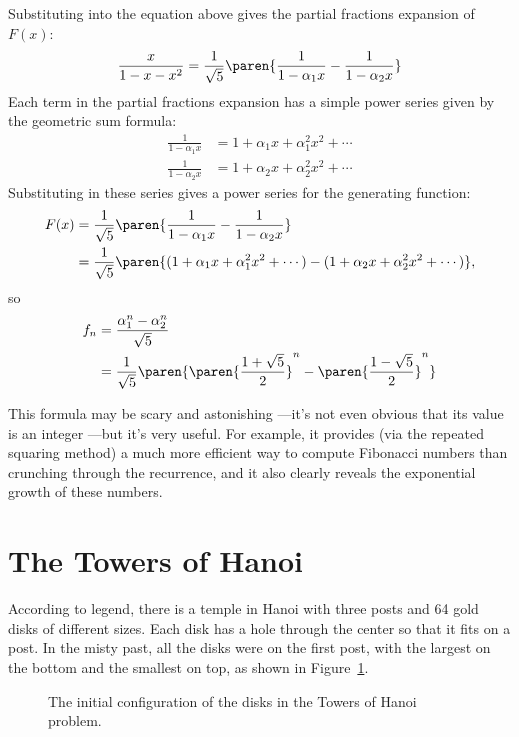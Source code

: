Substituting into the equation above gives the partial fractions
expansion of $F(x)$:
%
\[
\frac{x}{1 - x - x^2} =
        \frac{1}{\sqrt{5}}
        \paren{\frac{1}{1 - \alpha_1 x} - \frac{1}{1 - \alpha_2 x}}
\]
%
Each term in the partial fractions expansion has a simple power series
given by the geometric sum formula:
%
\begin{align*}
\frac{1}{1 - \alpha_1 x} & = 1 + \alpha_1 x + \alpha_1^2 x^2 + \cdots \\
\frac{1}{1 - \alpha_2 x} & = 1 + \alpha_2 x + \alpha_2^2 x^2 + \cdots
\end{align*}
%
Substituting in these series gives a power series for the generating
function:
%
\begin{align*}
F(x) & =
  \frac{1}{\sqrt{5}}
  \paren{\frac{1}{1 - \alpha_1 x} -
        \frac{1}{1 - \alpha_2 x}}\\
    & = \frac{1}{\sqrt{5}}
        \paren{(1 + \alpha_1 x + \alpha_1^2 x^2 + \cdots) -
        (1 + \alpha_2 x + \alpha_2^2 x^2 + \cdots)},
\end{align*}
so
\begin{align*}
 f_n & = \frac{\alpha_1^n - \alpha_2^n}{\sqrt{5}} \\
                & = \frac{1}{\sqrt{5}}
        \paren{
         \paren{\frac{1 + \sqrt{5}}{2}}^n -
         \paren{\frac{1 - \sqrt{5}}{2}}^n}
\end{align*}

This formula may be scary and astonishing ---it's not even obvious that
its value is an integer ---but it's very useful.  For example, it provides
(via the repeated squaring method) a much more efficient way to compute
Fibonacci numbers than crunching through the recurrence, and it also
clearly reveals the exponential growth of these numbers.

\iffalse

\section{The Towers of Hanoi}

According to legend, there is a temple in Hanoi with three posts and
64 gold disks of different sizes.  Each disk has a hole through the
center so that it fits on a post.  In the misty past, all the disks
were on the first post, with the largest on the bottom and the
smallest on top, as shown in Figure~\ref{fig:10A1}.

\begin{figure}


\caption{The initial configuration of the disks in the Towers of Hanoi
  problem.}

\label{fig:10A1}

\end{figure}

